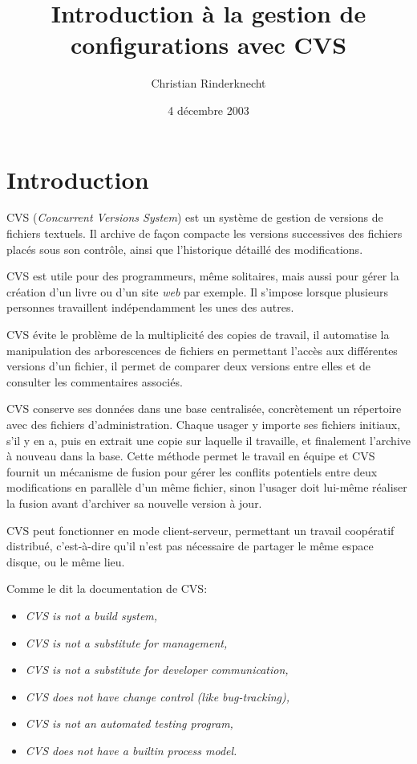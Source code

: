 \documentclass[11pt,a4paper]{article}
\title{Introduction à la gestion de configurations avec CVS}
\author{Christian Rinderknecht}
\date{4 décembre 2003}
\begin{document}
\maketitle

\section{Introduction}

CVS (\emph{Concurrent Versions System}) est un système de gestion de
versions de fichiers textuels. Il archive de façon compacte les
versions successives des fichiers placés sous son contrôle, ainsi que
l'historique détaillé des modifications.

\bigskip

CVS est utile pour des programmeurs, même solitaires, mais aussi pour
gérer la création d'un livre ou d'un site \emph{web} par exemple. Il
s'impose lorsque plusieurs personnes travaillent indépendamment les
unes des autres.

\bigskip

CVS évite le problème de la multiplicité des copies de travail, il
automatise la manipulation des arborescences de fichiers en permettant
l'accès aux différentes versions d'un fichier, il permet de comparer
deux versions entre elles et de consulter les commentaires associés.

\bigskip

CVS conserve ses données dans une base centralisée, concrètement un
répertoire avec des fichiers d'administration. Chaque usager y importe
ses fichiers initiaux, s'il y en a, puis en extrait une copie sur
laquelle il travaille, et finalement l'archive à nouveau dans la
base. Cette méthode permet le travail en équipe et CVS fournit un
mécanisme de fusion pour gérer les conflits potentiels entre deux
modifications en parallèle d'un même fichier, sinon l'usager doit
lui-même réaliser la fusion avant d'archiver sa nouvelle version à
jour.

\bigskip

CVS peut fonctionner en mode client-serveur, permettant un travail
coopératif distribué, c'est-à-dire qu'il n'est pas nécessaire de
partager le même espace disque, ou le même lieu.

\bigskip

Comme le dit la documentation de CVS:

\begin{itemize}
  \item \emph{CVS is not a build system,}
  \item \emph{CVS is not a substitute for management,}
  \item \emph{CVS is not a substitute for developer communication,}
  \item \emph{CVS does not have change control (like bug-tracking),}
  \item \emph{CVS is not an automated testing program,}
  \item \emph{CVS does not have a builtin process model.}
\end{itemize}
\end{document}
